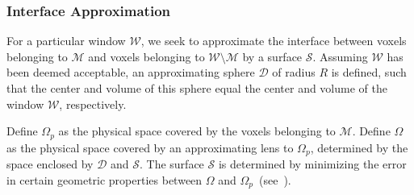 \subsubsection{Interface Approximation}

For a particular window $\mathcal{W}$, we seek to approximate the interface between voxels belonging to $\mathcal{M}$ and voxels belonging to $\mathcal{W} \setminus \mathcal{M}$ by a surface $\mathcal{S}$. Assuming $\mathcal{W}$ has been deemed acceptable, an approximating sphere $\mathcal{D}$ of radius $R$ is defined, such that the center and volume of this sphere equal the center and volume of the window $\mathcal{W}$, respectively.

Define $\Omega_p$ as the physical space covered by the voxels belonging to $\mathcal{M}$. Define $\Omega$ as the physical space covered by an approximating lens to $\Omega_p$, determined by the space enclosed by $\mathcal{D}$ and $\mathcal{S}$. The surface $\mathcal{S}$ is determined by minimizing the error in certain geometric properties between $\Omega$ and $\Omega_p$~(see~).

